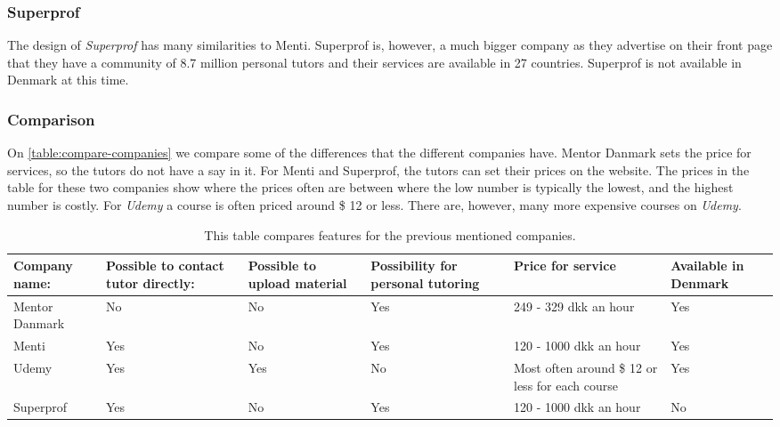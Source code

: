 \subsubsection{Superprof}
The design of \textit{Superprof} has many similarities to Menti.
Superprof is, however, a much bigger company as they advertise on their front page that they have a community of 8.7 million personal tutors \cite{superprof} and their services are available in 27 countries.
Superprof is not available in Denmark at this time.

\subsubsection{Comparison}
On \autoref{table:compare-companies} we compare some of the differences that the different companies have.
Mentor Danmark sets the price for services, so the tutors do not have a say in it.
For Menti and Superprof, the tutors can set their prices on the website. 
The prices in the table for these two companies show where the prices often are between where the low number is typically the lowest, and the highest number is costly.
For \textit{Udemy} a course is often priced around \$ 12 or less. 
There are, however, many more expensive courses on \textit{Udemy}.

\begin{table}[h]
    \begin{tabular}{|p{2cm}|p{2cm}|p{2cm}|p{2cm}|p{2cm}|p{2cm}|}
    \hline
    Company name:  & Possible to contact tutor directly: & Possible to upload material & Possibility for personal tutoring & Price for service                               & Available in Denmark \\ \hline
    Mentor Danmark & No                                  & No                          & Yes                               & 249 - 329 dkk an hour                           & Yes                  \\ \hline
    Menti          & Yes                                 & No                          & Yes                               & 120 - 1000 dkk an hour                          & Yes                  \\ \hline
    Udemy          & Yes                                 & Yes                         & No                                & Most often around \$ 12 or less for each course & Yes                  \\ \hline
    Superprof      & Yes                                 & No                          & Yes                               & 120 - 1000 dkk an hour                          & No                   \\ \hline
    \end{tabular}
    \caption{This table compares features for the previous mentioned companies.}
    \label{table:compare-companies}
\end{table}
